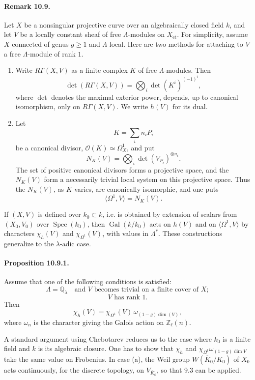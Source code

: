 \documentclass[10pt]{article}
\newcommand{\Q}{\mathbb Q}
\newcommand{\Z}{\mathbb Z}
\newcommand{\Gal}{\operatorname{Gal}}
\newcommand{\Spec}{\operatorname{Spec}}
\providecommand{\Spec}{\operatorname{Spec}}
\providecommand{\Gal}{\operatorname{Gal}}
\providecommand{\Gal}{\operatorname{Gal}}
\providecommand{\Spec}{\operatorname{Spec}}
\providecommand{\Spec}{\operatorname{Spec}}
\providecommand{\Gal}{\operatorname{Gal}}
\providecommand{\Gal}{\operatorname{Gal}}
\begin{document}
\paragraph{Remark 10.9.} Let \(X\) be a nonsingular projective curve over an algebraically closed field \(k\), and let \(V\) be a locally constant sheaf of free \(\Lambda\)-modules on \(X_{\mathrm{\acute et}}\). For simplicity, assume \(X\) connected of genus \(g\ge1\) and \(\Lambda\) local. Here are two methods for attaching to \(V\) a free \(\Lambda\)-module of rank \(1\).

\begin{enumerate}[label=(\alph*)]
\item Write \(R\Gamma(X,V)\) as a finite complex \(K\) of free \(\Lambda\)-modules. Then
\[
\det(R\Gamma(X,V))=
\bigotimes_i \det(K^i)^{(-1)^i},
\]
where \(\det\) denotes the maximal exterior power, depends, up to canonical isomorphism, only on \(R\Gamma(X,V)\). We write \(h(V)\) for its dual.

\item Let
\[
K=\sum_i n_iP_i
\]
be a canonical divisor, \(\mathcal O(K)\simeq\Omega_X^1\), and put
\[
N_K(V)=\bigotimes_i \det(V_{P_i})^{\otimes n_i}.
\]
The set of positive canonical divisors forms a projective space, and the \(N_K(V)\) form a necessarily trivial local system on this projective space. Thus the \(N_K(V)\), as \(K\) varies, are canonically isomorphic, and one puts
\[
\langle\Omega^1,V\rangle=N_K(V).
\]
\end{enumerate}

If \((X,V)\) is defined over \(k_0\subset k\), i.e. is obtained by extension of scalars from \((X_0,V_0)\) over \(\Spec(k_0)\), then \(\Gal(k/k_0)\) acts on \(h(V)\) and on \(\langle\Omega^1,V\rangle\) by characters \(\chi_h(V)\) and \(\chi_{\Omega^1}(V)\), with values in \(\Lambda^*\). These constructions generalize to the \(\lambda\)-adic case.

\paragraph{Proposition 10.9.1.} Assume that one of the following conditions is satisfied:
\[
\tag{a}
\Lambda=\Q_\lambda\quad\text{and }V\text{ becomes trivial on a finite cover of }X;
\]
\[
\tag{b}
V\text{ has rank }1.
\]
Then
\[
\tag{10.9.1}
\chi_h(V)=\chi_{\Omega^1}(V)\,\omega_{(1-g)\dim(V)},
\]
where \(\omega_n\) is the character giving the Galois action on \(\Z_\ell(n)\).

A standard argument using Chebotarev reduces us to the case where \(k_0\) is a finite field and \(k\) is its algebraic closure. One has to show that \(\chi_h\) and \(\chi_{\Omega^1}\omega_{(1-g)\dim V}\) take the same value on Frobenius. In case (a), the Weil group \(W(\overline K_0/K_0)\) of \(X_0\) acts continuously, for the discrete topology, on \(V_{\overline K_0}\), so that 9.3 can be applied.
\end{document}
